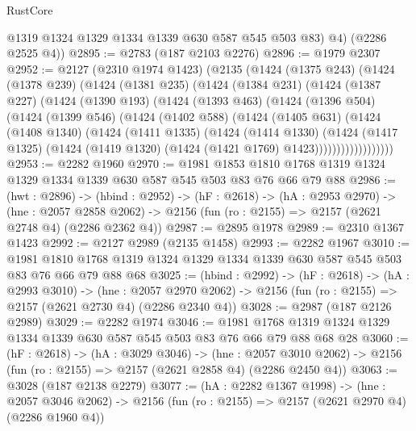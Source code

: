 \begin{lexlean}{RustCore}
\begin{coremodule}
          @1319
          @1324
          @1329
          @1334
          @1339
          @630
          @587
          @545
          @503
          @83)
        @4)
      (@2286 @2525 @4))
@2895 := @2783 (@187 @2103 @2276)
@2896 := @1979 @2307
@2952 := @2127
    (@2310 @1974 @1423)
    (@2135
      (@1424
        (@1375 @243)
        (@1424
          (@1378 @239)
          (@1424
            (@1381 @235)
            (@1424
              (@1384 @231)
              (@1424
                (@1387 @227)
                (@1424
                  (@1390 @193)
                  (@1424
                    (@1393 @463)
                    (@1424
                      (@1396 @504)
                      (@1424
                        (@1399 @546)
                        (@1424
                          (@1402 @588)
                          (@1424
                            (@1405 @631)
                            (@1424
                              (@1408 @1340)
                              (@1424
                                (@1411 @1335)
                                (@1424
                                  (@1414 @1330)
                                  (@1424
                                    (@1417 @1325)
                                    (@1424
                                      (@1419 @1320)
                                      (@1424 (@1421 @1769) @1423))))))))))))))))))
@2953 := @2282 @1960
@2970 := @1981
    @1853
    @1810
    @1768
    @1319
    @1324
    @1329
    @1334
    @1339
    @630
    @587
    @545
    @503
    @83
    @76
    @66
    @79
    @88
@2986 := (hwt : @2896) ->
  (hbind : @2952) ->
  (hF : @2618) ->
  (hA : @2953 @2970) ->
  (hne : @2057 @2858 @2062) -> @2156 (fun (ro : @2155) => @2157 (@2621 @2748 @4) (@2286 @2362 @4))
@2987 := @2895 @1978
@2989 := @2310 @1367 @1423
@2992 := @2127 @2989 (@2135 @1458)
@2993 := @2282 @1967
@3010 := @1981 @1810 @1768 @1319 @1324 @1329 @1334 @1339 @630 @587 @545 @503 @83 @76 @66 @79 @88 @68
@3025 := (hbind : @2992) ->
  (hF : @2618) ->
  (hA : @2993 @3010) ->
  (hne : @2057 @2970 @2062) -> @2156 (fun (ro : @2155) => @2157 (@2621 @2730 @4) (@2286 @2340 @4))
@3028 := @2987 (@187 @2126 @2989)
@3029 := @2282 @1974
@3046 := @1981 @1768 @1319 @1324 @1329 @1334 @1339 @630 @587 @545 @503 @83 @76 @66 @79 @88 @68 @28
@3060 := (hF : @2618) ->
  (hA : @3029 @3046) ->
  (hne : @2057 @3010 @2062) -> @2156 (fun (ro : @2155) => @2157 (@2621 @2858 @4) (@2286 @2450 @4))
@3063 := @3028 (@187 @2138 @2279)
@3077 := (hA : @2282 @1367 @1998) ->
  (hne : @2057 @3046 @2062) -> @2156 (fun (ro : @2155) => @2157 (@2621 @2970 @4) (@2286 @1960 @4))

\end{coremodule}
\end{lexlean}
